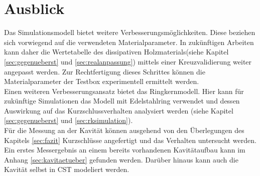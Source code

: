 \section{Ausblick}
Das Simulationsmodell bietet weitere Verbesserungsm\"oglichkeiten. Diese beziehen sich vorwiegend auf die verwendeten Materialparameter.
In zuk\"unftigen Arbeiten kann daher die Wertetabelle des dissipativen Holzmaterials(siehe Kapitel \ref{sec:gegenueberst} und \ref{sec:realanpassung}) mittels einer Kreuzvalidierung weiter angepasst werden. Zur Rechtfertigung dieses Schrittes k\"onnen die Materialparameter der Testbox experimentell ermittelt werden.\\
Einen weiteren Verbesserungsansatz bietet das Ringkernmodell. Hier kann f\"ur zuk\"unftige Simulationen das Modell mit Edelstahlring verwendet und dessen Auswirkung auf das Kurzschlussverhalten analysiert werden (siehe Kapitel \ref{sec:gegenueberst} und \ref{sec:rksimulation}).\\
F\"ur die Messung an der Kavit\"at k\"onnen ausgehend von den \"Uberlegungen des Kapitels \ref{sec:fazit} Kurzschl\"usse angefertigt und das Verhalten untersucht werden. Ein erstes Messergebnis an einem bereits vorhandenen Kavit\"ataufbau kann im Anhang \ref{sec:kavitaetueber} gefunden werden. Dar\"uber hinaus kann auch die Kavit\"at selbst in CST modeliert werden.